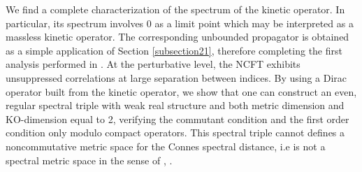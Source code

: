 \documentclass[a4paper,11pt,twoside]{article}
\numberwithin{equation}{section}
\theoremstyle{nonumberplain}
\newcounter{and}
\begin{document}
We find a complete characterization of the spectrum of the kinetic operator. In particular, its spectrum involves $0$ as a limit point which may be interpreted as a massless kinetic operator. The corresponding unbounded propagator is obtained as a simple application of Section \ref{subsection21}, therefore completing the first analysis performed in \cite{MVW13}.  At the perturbative level, the NCFT exhibits unsuppressed correlations at large separation between indices. By using a Dirac operator built from the kinetic operator, we show that one can construct an even, regular spectral triple with weak real structure and both metric dimension and KO-dimension equal to 2, verifying the commutant condition and the first order condition only modulo compact operators. This spectral triple cannot defines a noncommutative metric space for the Connes spectral distance, i.e is not a spectral metric space in the sense of \cite{homot-moyal}, \cite{bel-mar}.
\end{document}
